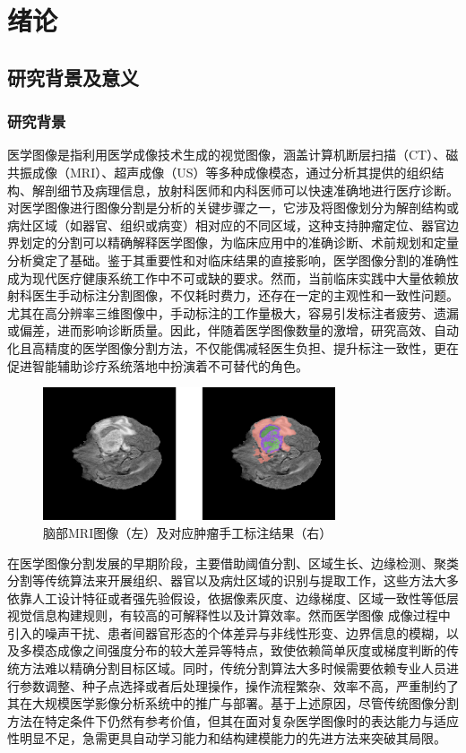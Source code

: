 \section{绪论}

\subsection{研究背景及意义}
\subsubsection{研究背景}

医学图像是指利用医学成像技术生成的视觉图像，涵盖计算机断层扫描（CT）、磁共振成像（MRI）、超声成像（US）等多种成像模态，通过分析其提供的组织结构、解剖细节及病理信息，放射科医师和内科医师可以快速准确地进行医疗诊断。对医学图像进行图像分割是分析的关键步骤之一，它涉及将图像划分为解剖结构或病灶区域（如器官、组织或病变）相对应的不同区域，这种支持肿瘤定位、器官边界划定的分割可以精确解释医学图像，为临床应用中的准确诊断、术前规划和定量分析奠定了基础\cite{panayides2020}。鉴于其重要性和对临床结果的直接影响，医学图像分割的准确性成为现代医疗健康系统工作中不可或缺的要求。然而，当前临床实践中大量依赖放射科医生手动标注分割图像，不仅耗时费力，还存在一定的主观性和一致性问题。尤其在高分辨率三维图像中，手动标注的工作量极大，容易引发标注者疲劳、遗漏或偏差，进而影响诊断质量。因此，伴随着医学图像数量的激增，研究高效、自动化且高精度的医学图像分割方法，不仅能偶减轻医生负担、提升标注一致性，更在促进智能辅助诊疗系统落地中扮演着不可替代的角色。

\begin{figure}[h]
    \centering
    \includegraphics[width=0.77\textwidth]{fig/flair_and_mask.png}
    \caption{脑部MRI图像（左）及对应肿瘤手工标注结果（右）}
    \label{brian_tumor}
\end{figure}

在医学图像分割发展的早期阶段，主要借助阈值分割、区域生长、边缘检测、聚类分割等传统算法来开展组织、器官以及病灶区域的识别与提取工作，这些方法大多依靠人工设计特征或者强先验假设，依据像素灰度、边缘梯度、区域一致性等低层视觉信息构建规则，有较高的可解释性以及计算效率。然而医学图像 成像过程中引入的噪声干扰、患者间器官形态的个体差异与非线性形变、边界信息的模糊，以及多模态成像之间强度分布的较大差异等特点\cite{mohdsagheer2020}，致使依赖简单灰度或梯度判断的传统方法难以精确分割目标区域。同时，传统分割算法大多时候需要依赖专业人员进行参数调整、种子点选择或者后处理操作，操作流程繁杂、效率不高，严重制约了其在大规模医学影像分析系统中的推广与部署。基于上述原因，尽管传统图像分割方法在特定条件下仍然有参考价值，但其在面对复杂医学图像时的表达能力与适应性明显不足，急需更具自动学习能力和结构建模能力的先进方法来突破其局限。

